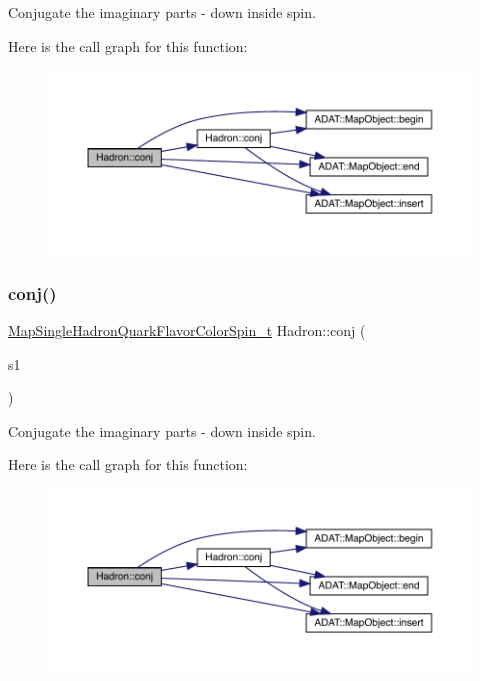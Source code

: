 Conjugate the imaginary parts -\/ down inside spin. 

Here is the call graph for this function\+:\nopagebreak
\begin{figure}[H]
\begin{center}
\leavevmode
\includegraphics[width=350pt]{d1/daf/namespaceHadron_a218b77b239d871def6267d4b34bdf7c1_cgraph}
\end{center}
\end{figure}
\mbox{\label{namespaceHadron_a225bbef2231c488eb28201396913bae0}} 
\subsubsection{\texorpdfstring{conj()}{conj()}\hspace{0.1cm}{\footnotesize\ttfamily [3/3]}}
{\footnotesize\ttfamily \mbox{\hyperlink{namespaceHadron_a03b319764f85c20434f20a269ce5f388}{Map\+Single\+Hadron\+Quark\+Flavor\+Color\+Spin\+\_\+t}} Hadron\+::conj (\begin{DoxyParamCaption}\item[{const \mbox{\hyperlink{namespaceHadron_a03b319764f85c20434f20a269ce5f388}{Map\+Single\+Hadron\+Quark\+Flavor\+Color\+Spin\+\_\+t}} \&}]{s1 }\end{DoxyParamCaption})}



Conjugate the imaginary parts -\/ down inside spin. 

Here is the call graph for this function\+:\nopagebreak
\begin{figure}[H]
\begin{center}
\leavevmode
\includegraphics[width=350pt]{d1/daf/namespaceHadron_a225bbef2231c488eb28201396913bae0_cgraph}
\end{center}
\end{figure}
\mbox{\label{namespaceHadron_af2328410f9a0a7191a4d319284425fed}} 
